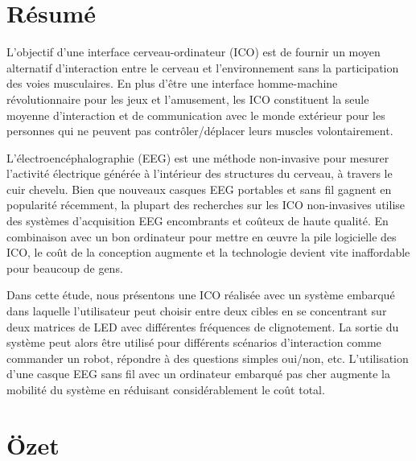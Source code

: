 \documentclass[12pt]{article}
\numberwithin{equation}{section}
\numberwithin{figure}{section}
\numberwithin{table}{section}
\begin{document}
\clearpage

\vspace*{-0.35cm}
\thispagestyle{empty}
\section*{R\'{e}sum\'{e}}
\vspace*{6pt}

\par{
    L'objectif d'une interface cerveau-ordinateur (ICO) est de fournir un moyen alternatif d'interaction
    entre le cerveau et l'environnement sans la participation des voies musculaires.
    En plus d'être une interface homme-machine révolutionnaire pour les jeux et l'amusement,
    les ICO constituent la seule moyenne d'interaction et de communication avec le monde extérieur
    pour les personnes qui ne peuvent pas contrôler/déplacer leurs muscles volontairement.
}
\par{
    L'électroencéphalographie (EEG) est une méthode non-invasive pour mesurer l'activité électrique
    générée à l'intérieur des structures du cerveau, à travers le cuir chevelu. Bien que nouveaux casques
    EEG portables et sans fil gagnent en popularité récemment, la plupart des recherches
    sur les ICO non-invasives utilise des systèmes d'acquisition EEG encombrants et coûteux de haute qualité.
    En combinaison avec un bon ordinateur pour mettre en œuvre la pile logicielle des ICO, le coût de la conception
    augmente et la technologie devient vite inaffordable pour beaucoup de gens.
}
\par{
    Dans cette étude, nous présentons une ICO réalisée avec un système embarqué
    dans laquelle l'utilisateur peut choisir entre deux cibles en se concentrant sur deux matrices de LED
    avec différentes fréquences de clignotement. La sortie du système peut alors être utilisé pour différents
    scénarios d'interaction comme commander un robot, répondre à des questions simples oui/non, etc.
    L'utilisation d'une casque EEG sans fil avec un ordinateur embarqué pas cher
    augmente la mobilité du système en réduisant considérablement le coût total.
}
\clearpage

\vspace*{-0.35cm}
\thispagestyle{empty}
\section*{\"{O}zet}
\vspace*{6pt}
\end{document}
